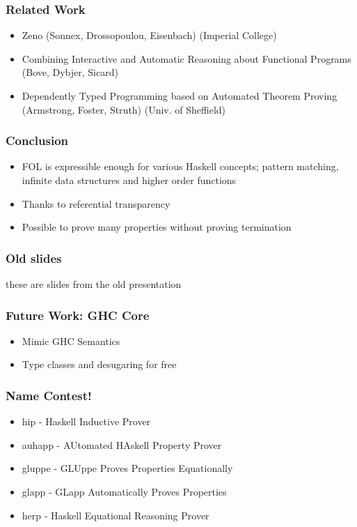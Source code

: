 \documentclass[serif,professionalfont]{beamer}
\begin{document}
\begin{frame}
  \frametitle{Related Work}
  \begin{itemize}
    \item Zeno (Sonnex, Drossopoulou, Eisenbach) {\footnotesize(Imperial College)}

    \item Combining Interactive and Automatic Reasoning about Functional Programs \\
          (Bove, Dybjer, Sicard)
    \item Dependently Typed Programming based on Automated Theorem Proving \\
          (Armstrong, Foster, Struth) {\footnotesize(Univ. of Sheffield)}
  \end{itemize}
\end{frame}

\begin{frame}
\frametitle{Conclusion}

\begin{itemize}
\item FOL is expressible enough for various Haskell concepts; pattern
  matching, infinite data structures and higher order functions
\item Thanks to referential transparency
\item Possible to prove many properties without proving termination
\end{itemize}
\end{frame}


\begin{frame}
\frametitle{Old slides}
these are slides from the old presentation
\end{frame}


\begin{frame}
\frametitle{Future Work: GHC Core}
\label{sec-9}
\begin{itemize}

\item Mimic GHC Semantics\\
\label{sec-9-1}%
\item Type classes and desugaring for free\\
\label{sec-9-2}%
\end{itemize} %
\end{frame}

\begin{frame}
\frametitle{Name Contest!}
\label{sec-11}
\begin{itemize}
\item hip - Haskell Inductive Prover\\
\item auhapp - AUtomated HAskell Property Prover\\
\item gluppe - GLUppe Proves Properties Equationally\\
\item glapp - GLapp Automatically Proves Properties\\
\item herp - Haskell Equational Reasoning Prover\\
\end{itemize}
\end{frame}
\end{document}
